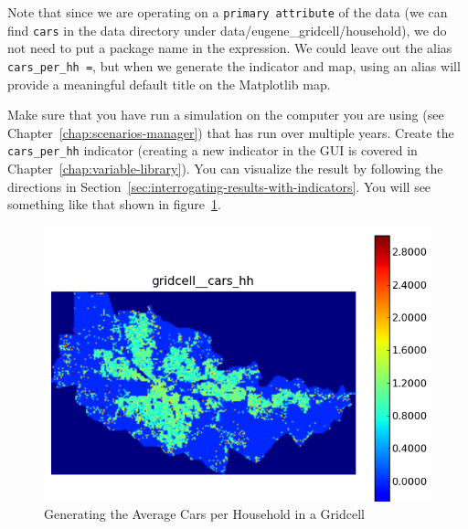 
Note that since we are operating on a \verb#primary attribute# of the
data (we can find \verb#cars# in the data directory under
data/eugene\_gridcell/household), we do not need to put a package name
in the expression.  We could leave out the alias \verb#cars_per_hh =#,
but when we generate the indicator and map, using an alias will provide
a meaningful default title on the Matplotlib map.

Make sure that you have run a
simulation on the computer you are using (see
Chapter~\ref{chap:scenarios-manager}) that has run over multiple
years. Create the \verb#cars_per_hh# indicator (creating a new
indicator in the GUI is covered in
Chapter~\ref{chap:variable-library}). You can visualize the result
by following the directions in
Section~\ref{sec:interrogating-results-with-indicators}. You
will see something like that shown in
figure~\ref{fig:indicator-cars-gridcell-2}.


\begin{figure}[htp]
\begin{center}
\includegraphics[scale=0.4]{graphics/indicator-cars-gridcell-2.png}
\end{center}
\caption{Generating the Average Cars per Household in a Gridcell}
\label{fig:indicator-cars-gridcell-2}
\end{figure}

